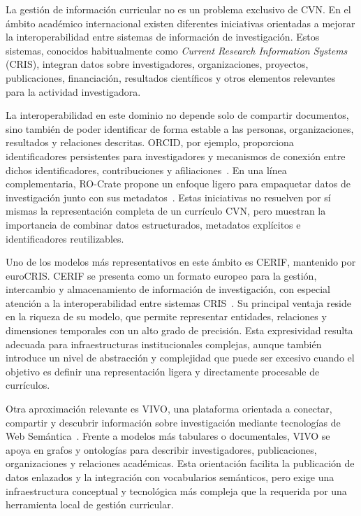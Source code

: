 La gestión de información curricular no es un problema exclusivo de CVN. En el
ámbito académico internacional existen diferentes iniciativas orientadas a mejorar
la interoperabilidad entre sistemas de información de investigación. Estos
sistemas, conocidos habitualmente como \textit{Current Research Information
Systems} (CRIS), integran datos sobre investigadores, organizaciones, proyectos,
publicaciones, financiación, resultados científicos y otros elementos relevantes
para la actividad investigadora.

La interoperabilidad en este dominio no depende solo de compartir documentos, sino
también de poder identificar de forma estable a las personas, organizaciones,
resultados y relaciones descritas. ORCID, por ejemplo, proporciona identificadores
persistentes para investigadores y mecanismos de conexión entre dichos
identificadores, contribuciones y afiliaciones~\cite{orcid_about}. En una línea
complementaria, RO-Crate propone un enfoque ligero para empaquetar datos de
investigación junto con sus metadatos~\cite{ro_crate}. Estas iniciativas no
resuelven por sí mismas la representación completa de un currículo CVN, pero
muestran la importancia de combinar datos estructurados, metadatos explícitos e
identificadores reutilizables.

Uno de los modelos más representativos en este ámbito es CERIF, mantenido por
euroCRIS. CERIF se presenta como un formato europeo para la gestión, intercambio y
almacenamiento de información de investigación, con especial atención a la
interoperabilidad entre sistemas CRIS~\cite{eurocris_cerif}. Su principal ventaja
reside en la riqueza de su modelo, que permite representar entidades, relaciones y
dimensiones temporales con un alto grado de precisión. Esta expresividad resulta
adecuada para infraestructuras institucionales complejas, aunque también introduce
un nivel de abstracción y complejidad que puede ser excesivo cuando el objetivo es
definir una representación ligera y directamente procesable de currículos.

Otra aproximación relevante es VIVO, una plataforma orientada a conectar,
compartir y descubrir información sobre investigación mediante tecnologías de Web
Semántica~\cite{vivo_project}. Frente a modelos más tabulares o documentales,
VIVO se apoya en grafos y ontologías para describir investigadores, publicaciones,
organizaciones y relaciones académicas. Esta orientación facilita la publicación
de datos enlazados y la integración con vocabularios semánticos, pero exige una
infraestructura conceptual y tecnológica más compleja que la requerida por una
herramienta local de gestión curricular.

